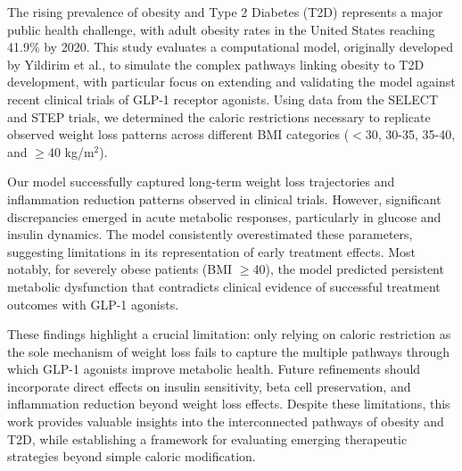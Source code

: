 The rising prevalence of obesity and Type 2 Diabetes (T2D) represents a major public health challenge, with adult obesity rates in the United States reaching 41.9\% by 2020. This study evaluates a computational model, originally developed by Yildirim et al.\cite{Yildirim2023}, to simulate the complex pathways linking obesity to T2D development, with particular focus on extending and validating the model against recent clinical trials of GLP-1 receptor agonists. Using data from the SELECT and STEP trials, we determined the caloric restrictions necessary to replicate observed weight loss patterns across different BMI categories ($<$30, 30-35, 35-40, and $\geq$40 kg/m$^2$).

Our model successfully captured long-term weight loss trajectories and inflammation reduction patterns observed in clinical trials. However, significant discrepancies emerged in acute metabolic responses, particularly in glucose and insulin dynamics. The model consistently overestimated these parameters, suggesting limitations in its representation of early treatment effects. Most notably, for severely obese patients (BMI $\geq$40), the model predicted persistent metabolic dysfunction that contradicts clinical evidence of successful treatment outcomes with GLP-1 agonists.

These findings highlight a crucial limitation: only relying on caloric restriction as the sole mechanism of weight loss fails to capture the multiple pathways through which GLP-1 agonists improve metabolic health. Future refinements should incorporate direct effects on insulin sensitivity, beta cell preservation, and inflammation reduction beyond weight loss effects. Despite these limitations, this work provides valuable insights into the interconnected pathways of obesity and T2D, while establishing a framework for evaluating emerging therapeutic strategies beyond simple caloric modification.